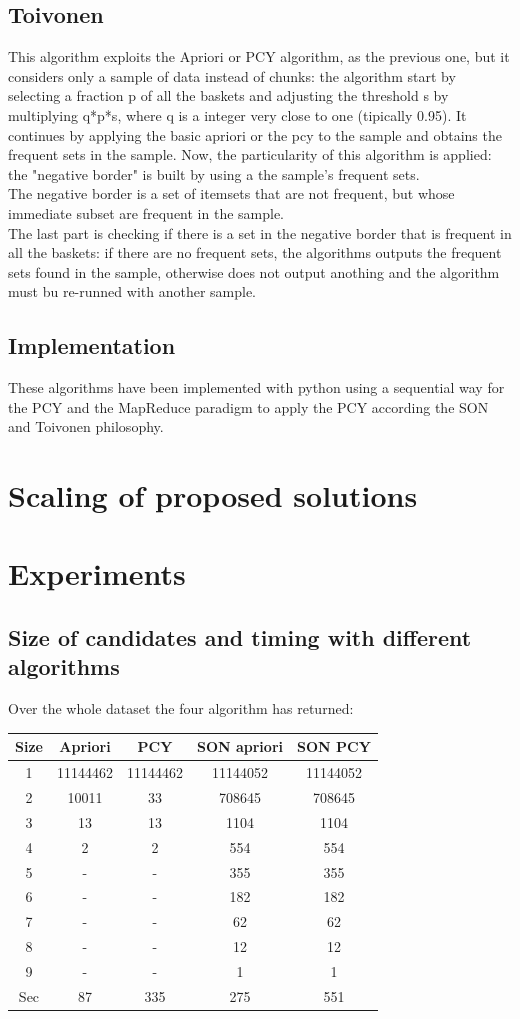 \documentclass[14pt]{extarticle}
\begin{document}
\subsection{Toivonen}
This algorithm exploits the Apriori or PCY algorithm, as the previous one, but it considers only a sample of data instead of chunks: 
the algorithm start by selecting a fraction p of all the baskets and adjusting the threshold s by multiplying q*p*s, where q is a integer very close to one (tipically 0.95). It continues by applying the basic apriori or the pcy to the sample and obtains the frequent sets in the sample. Now, the particularity of this algorithm is applied: the "negative border" is built by using a the sample's frequent sets.\\
The negative border is a set of itemsets that are not frequent, but whose immediate subset are frequent in the sample.\\
The last part is checking if there is a set in the negative border that is frequent in all the baskets: if there are no frequent sets, the algorithms outputs the frequent sets found in the sample, otherwise does not output anothing and the algorithm must bu re-runned with another sample.

\subsection{Implementation}
These algorithms have been implemented with python using a sequential way for the PCY and the MapReduce paradigm to apply the PCY according the SON and Toivonen philosophy.


\section{Scaling of proposed solutions}
\section{Experiments}
\subsection{Size of candidates and timing with different algorithms}
Over the whole dataset the four algorithm has returned:
\begin{center}
\begin{tabular}{ |c|c|c|c|c| } 
 \hline
 Size & Apriori & PCY & SON apriori & SON PCY \\
 \hline
 1 & 11144462 & 11144462 & 11144052 & 11144052\\ 
 2 & 10011 & 33 & 708645 & 708645\\ 
 3 & 13 & 13 & 1104 & 1104\\ 
 4 & 2 & 2 & 554 & 554 \\
 5 & - & - & 355 & 355 \\
 6 & - & - & 182 & 182 \\
 7 & - & - & 62 & 62 \\
 8 & - & - & 12 & 12 \\
 9 & - & - & 1 & 1 \\
 \hline
 Sec & 87 & 335 & 275 & 551\\
 \hline
\end{tabular}
\end{center}
\end{document}
